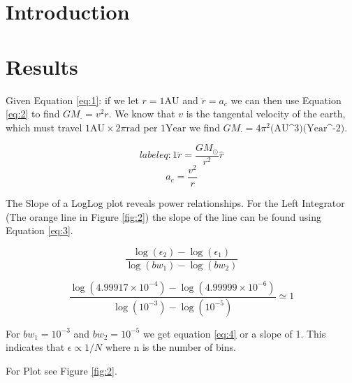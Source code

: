 \documentclass{article}
\author{\hwauthor}
\title{\hwtitle}
\date{\hwdate}
\begin{document}
\maketitle
\thispagestyle{fancy}

\section{Introduction}
 

\section{Results}

\bigskip
{}
\medskip

Given Equation \ref{eq:1}: if we let $ r = 1 \text{AU}$ and $ \ddot{r} = a_c$ we can then use Equation \ref{eq:2} to find $ GM_{\cdot} = v^2r $. We know that $ v $ is the tangental velocity of the earth, which must travel $ 1 \text{AU} \times 2\pi \text{rad} $ per $ 1 \text{Year} $ we find $ GM_{\cdot} = 4\pi^2 \text{(AU^3)(Year^-2)} $.

\begin{equation} label{eq:1}
	\ddot{r} = \frac{GM_{\odot}}{r^2}\hat{r}
\end{equation}
\begin{equation} \label{eq:2}
	a_c = \frac{v^2}{r}
\end{equation}

\bigskip
{}
\medskip

The Slope of a LogLog plot reveals power relationships. For the Left Integrator (The orange line in Figure \ref{fig:2}) the slope of the line can be found using Equation \ref{eq:3}. 

\begin{equation}\label{eq:3}
    \frac{\log(\epsilon_2)-\log(\epsilon_1)}{\log(bw_1)-\log(bw_2)}
\end{equation}

\begin{equation}\label{eq:4}
    \frac{\log(4.99917\times10^{-4})-\log(4.99999\times10^{-6})}{\log(10^{-3})-\log(10^{-5})} \simeq 1
\end{equation}{}

For $ bw_1 = 10^{-3}$ and $bw_2 = 10^{-5} $ we get equation \ref{eq:4} or a slope of 1. This indicates that $ \epsilon \propto 1/N$ where n is the number of bins.

For Plot see Figure \ref{fig:2}.
\end{document}
